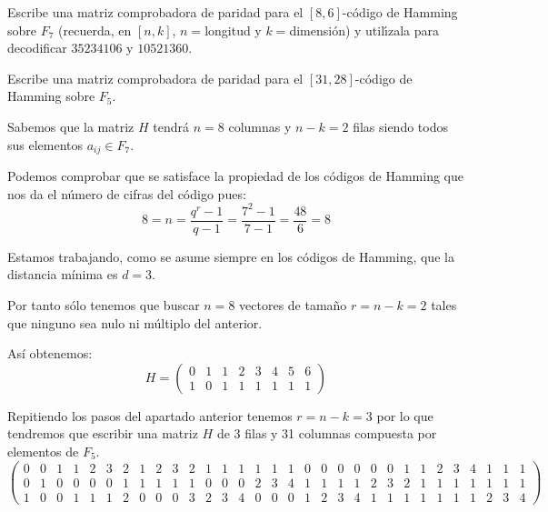 \begin{problem}[6]
\ppart Escribe una matriz comprobadora de paridad para el $[8,6]$-código de Hamming
sobre $ F_7$ (recuerda, en $[n,k]$, $n=$longitud y $k=$dimensión)
y util\'{\i}zala para decodificar $35234106$ y $10521360$.

\ppart  Escribe una matriz comprobadora de paridad para el
$[31,28]$-código de Hamming sobre $ F_5$.


\solution



\spart

Sabemos que la matriz $H$ tendrá $n=8$ columnas y $n-k=2$ filas siendo todos sus elementos $a_{ij}\in F_7$.

Podemos comprobar que se satisface la propiedad de los códigos de Hamming que nos da el número de cifras del código pues:
\[8=n = \frac{q^r-1}{q-1} = \frac{7^2-1}{7-1} = \frac{48}{6} = 8\]

Estamos trabajando, como se asume siempre en los códigos de Hamming, que la distancia mínima es $d=3$.

Por tanto sólo tenemos que buscar $n=8$ vectores de tamaño $r=n-k=2$ tales que ninguno sea nulo ni múltiplo del anterior.

Así obtenemos:
\[H = \left(\begin{array}{cccccccc}
0 & 1 & 1 & 2 & 3 & 4 & 5 & 6\\
1 & 0 & 1 & 1 & 1 & 1 & 1 & 1
\end{array} \right)\]

\spart

Repitiendo los pasos del apartado anterior tenemos $r=n-k=3$ por lo que tendremos que escribir una matriz $H$ de 3 filas y 31 columnas compuesta por elementos de $F_5$.
\small
\[\left(\begin{array}{ccccccccccccccccccccccccccccccc}
0 & 0 & 1 & 1 & 2 & 3 & 2 & 1 & 2 & 3 & 2 & 1 & 1 & 1 & 1 & 1 & 1 & 0 & 0 & 0 & 0 & 0 & 0 & 1 & 1 & 2 & 3 & 4 & 1 & 1 & 1\\
0 & 1 & 0 & 0 & 0 & 0 & 1 & 1 & 1 & 1 & 1 & 0 & 0 & 0 & 2 & 3 & 4 & 1 & 1 & 1 & 1 & 2 & 3 & 2 & 1 & 1 & 1 & 1 & 1 & 1 & 1 \\
1 & 0 & 0 & 1 & 1 & 1 & 2 & 0 & 0 & 0 & 3 & 2 & 3 & 4 & 0 & 0 & 0 & 1 & 2 & 3 & 4 & 1 & 1 & 1 & 1 & 1 & 1 & 1 & 2 & 3 & 4
\end{array} \right)\]
\normalsize

\end{problem}


